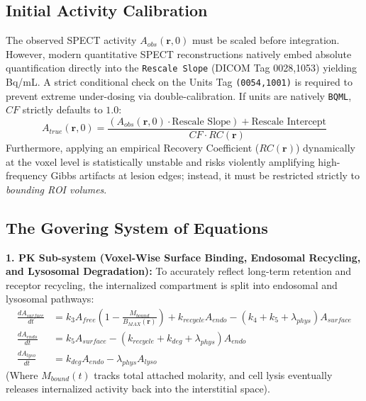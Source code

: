 \documentclass[11pt,a4paper]{article}
\begin{document}
\subsection{Initial Activity Calibration}
The observed SPECT activity $A_{obs}(\mathbf{r}, 0)$ must be scaled before integration. However, modern quantitative SPECT reconstructions natively embed absolute quantification directly into the \texttt{Rescale Slope} (DICOM Tag 0028,1053) yielding Bq/mL. A strict conditional check on the Units Tag \texttt{(0054,1001)} is required to prevent extreme under-dosing via double-calibration. If units are natively \texttt{BQML}, $CF$ strictly defaults to $1.0$:
\begin{equation}
    A_{true}(\mathbf{r}, 0) = \frac{\left( A_{obs}(\mathbf{r}, 0) \cdot \text{Rescale Slope} \right) + \text{Rescale Intercept}}{CF \cdot RC(\mathbf{r})}
\end{equation}
Furthermore, applying an empirical Recovery Coefficient ($RC(\mathbf{r})$) dynamically at the voxel level is statistically unstable and risks violently amplifying high-frequency Gibbs artifacts at lesion edges; instead, it must be restricted strictly to \textit{bounding ROI volumes}.

\subsection{The Govering System of Equations}
\textbf{1. PK Sub-system (Voxel-Wise Surface Binding, Endosomal Recycling, and Lysosomal Degradation):}
To accurately reflect long-term retention and receptor recycling, the internalized compartment is split into endosomal and lysosomal pathways:
\begin{align}
    \frac{dA_{surface}}{dt} &= k_3 A_{free} \left( 1 - \frac{M_{bound}}{B_{MAX}(\mathbf{r})} \right) + k_{recycle} A_{endo} - (k_4 + k_5 + \lambda_{phys}) A_{surface} \\
    \frac{dA_{endo}}{dt} &= k_5 A_{surface} - (k_{recycle} + k_{deg} + \lambda_{phys}) A_{endo} \\
    \frac{dA_{lyso}}{dt} &= k_{deg} A_{endo} - \lambda_{phys} A_{lyso}
\end{align}
(Where $M_{bound}(t)$ tracks total attached molarity, and cell lysis eventually releases internalized activity back into the interstitial space).
\end{document}
